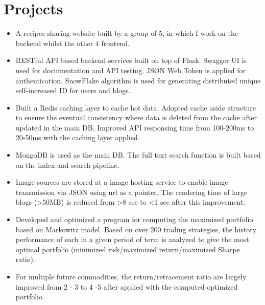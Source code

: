 \documentclass{resume}
\begin{document}
\section{Projects}

\begin{itemize}
  \item A recipes sharing website built by a group of 5, in which I work on the backend whilst the other 4 frontend.
  \item RESTful API based backend services built on top of Flask. Swagger UI is used for documentation and API testing. JSON Web Token is applied for authentication. SnowFlake algorithm is used for generating distributed unique self-increased ID for users and blogs.
  \item Built a Redis caching layer to cache hot data. Adopted cache aside structure to ensure the eventual consistency where data is deleted from the cache after updated in the main DB. Improved API responsing time from 100-200ms to 20-50ms with the caching layer applied.
  \item MongoDB is used as the main DB. The full text search function is built based on the index and search pipeline.
  \item Image sources are stored at a image hosting service to enable image transmission via JSON using url as a pointer. The rendering time of large blogs (>50MB) is reduced from >8 sec to <1 sec after this improvement.  
\end{itemize}

\begin{itemize}
  \item Developed and optimized a program for computing the maximized portfolio based on Markowitz model. Based on over 200 trading strategies, the history performance of each in a given period of term is analyzed to give the most optimal portfolio (minimized risk/maximized return/maximized Sharpe ratio).
  \item For multiple future commodities, the return/retracement ratio are largely improved from 2 - 3 to 4 -5 after applied with the computed optimized portfolio.
\end{itemize}
\end{document}
